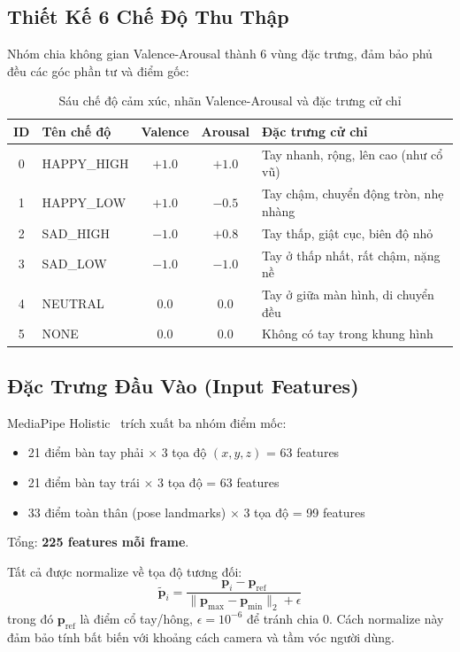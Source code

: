 \subsection{Thiết Kế 6 Chế Độ Thu Thập}

Nhóm chia không gian Valence-Arousal thành 6 vùng đặc trưng,
đảm bảo phủ đều các góc phần tư và điểm gốc:

\begin{table}[H]
  \centering
  \caption{Sáu chế độ cảm xúc, nhãn Valence-Arousal và đặc trưng cử chỉ}
  \label{tab:modes}
  \begin{tabular}{clccl}
    \toprule
    \textbf{ID} & \textbf{Tên chế độ} & \textbf{Valence} & \textbf{Arousal}
                & \textbf{Đặc trưng cử chỉ} \\
    \midrule
    0 & HAPPY\_HIGH  & $+1.0$ & $+1.0$
      & Tay nhanh, rộng, lên cao (như cổ vũ) \\
    1 & HAPPY\_LOW   & $+1.0$ & $-0.5$
      & Tay chậm, chuyển động tròn, nhẹ nhàng \\
    2 & SAD\_HIGH    & $-1.0$ & $+0.8$
      & Tay thấp, giật cục, biên độ nhỏ \\
    3 & SAD\_LOW     & $-1.0$ & $-1.0$
      & Tay ở thấp nhất, rất chậm, nặng nề \\
    4 & NEUTRAL      &  $0.0$ &  $0.0$
      & Tay ở giữa màn hình, di chuyển đều \\
    5 & NONE         &  $0.0$ &  $0.0$
      & Không có tay trong khung hình \\
    \bottomrule
  \end{tabular}
\end{table}

\subsection{Đặc Trưng Đầu Vào (Input Features)}

MediaPipe Holistic~\cite{mediapipe2019} trích xuất ba nhóm điểm mốc:
\begin{itemize}
  \item 21 điểm bàn tay phải $\times$ 3 tọa độ $(x, y, z)$ = 63 features
  \item 21 điểm bàn tay trái $\times$ 3 tọa độ = 63 features
  \item 33 điểm toàn thân (pose landmarks) $\times$ 3 tọa độ = 99 features
\end{itemize}
Tổng: \textbf{225 features mỗi frame}.

Tất cả được normalize về tọa độ tương đối:
\begin{equation}
  \tilde{\mathbf{p}}_i = \frac{\mathbf{p}_i - \mathbf{p}_{\text{ref}}}{\|\mathbf{p}_{\max} - \mathbf{p}_{\min}\|_2 + \epsilon}
\end{equation}
trong đó $\mathbf{p}_{\text{ref}}$ là điểm cổ tay/hông, $\epsilon = 10^{-6}$ để tránh chia 0.
Cách normalize này đảm bảo tính bất biến với khoảng cách camera và tầm vóc người dùng.

